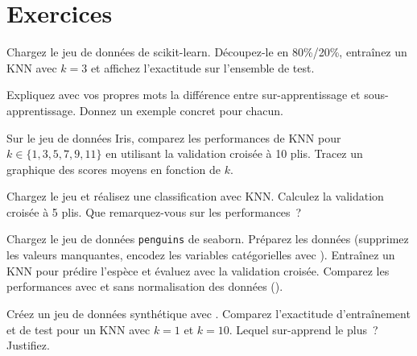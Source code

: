 \section{Exercices}

\begin{exercice}[$\star$]
Chargez le jeu de donn\'ees  de scikit-learn. D\'ecoupez-le en 80\%/20\%, entra\^inez un KNN avec $k=3$ et affichez l'exactitude sur l'ensemble de test.
\end{exercice}

\begin{exercice}[$\star$]
Expliquez avec vos propres mots la diff\'erence entre sur-apprentissage et sous-apprentissage. Donnez un exemple concret pour chacun.
\end{exercice}

\begin{exercice}[$\star\star$]
Sur le jeu de donn\'ees Iris, comparez les performances de KNN pour $k \in \{1, 3, 5, 7, 9, 11\}$ en utilisant la validation crois\'ee \`a 10 plis. Tracez un graphique des scores moyens en fonction de $k$.
\end{exercice}

\begin{exercice}[$\star\star$]
Chargez le jeu  et r\'ealisez une classification avec KNN. Calculez la validation crois\'ee \`a 5 plis. Que remarquez-vous sur les performances~?
\end{exercice}

\begin{exercice}[$\star\star\star$]
Chargez le jeu de donn\'ees \texttt{penguins} de seaborn. Pr\'eparez les donn\'ees (supprimez les valeurs manquantes, encodez les variables cat\'egorielles avec ). Entra\^inez un KNN pour pr\'edire l'esp\`ece et \'evaluez avec la validation crois\'ee. Comparez les performances avec et sans normalisation des donn\'ees ().
\end{exercice}

\begin{exercice}[$\star\star\star$]
Cr\'eez un jeu de donn\'ees synth\'etique avec . Comparez l'exactitude d'entra\^inement et de test pour un KNN avec $k=1$ et $k=10$. Lequel sur-apprend le plus~? Justifiez.
\end{exercice}

